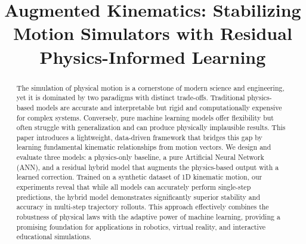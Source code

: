 \documentclass[conference]{IEEEtran}
\begin{document}
\title{Augmented Kinematics: Stabilizing Motion Simulators with Residual Physics-Informed Learning}

\author{
}

\maketitle

\begin{abstract}
The simulation of physical motion is a cornerstone of modern science and engineering, yet it is dominated by two paradigms with distinct trade-offs. Traditional physics-based models are accurate and interpretable but rigid and computationally expensive for complex systems. Conversely, pure machine learning models offer flexibility but often struggle with generalization and can produce physically implausible results. This paper introduces a lightweight, data-driven framework that bridges this gap by learning fundamental kinematic relationships from motion vectors. We design and evaluate three models: a physics-only baseline, a pure Artificial Neural Network (ANN), and a residual hybrid model that augments the physics-based output with a learned correction. Trained on a synthetic dataset of 1D kinematic motion, our experiments reveal that while all models can accurately perform single-step predictions, the hybrid model demonstrates significantly superior stability and accuracy in multi-step trajectory rollouts. This approach effectively combines the robustness of physical laws with the adaptive power of machine learning, providing a promising foundation for applications in robotics, virtual reality, and interactive educational simulations.
\end{abstract}
\end{document}
